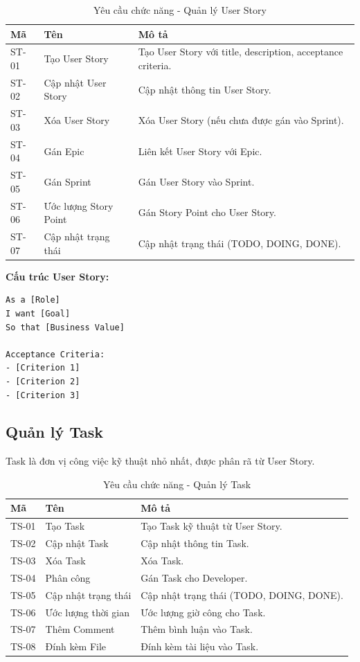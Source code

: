 \documentclass[12pt,a4paper]{report}
\begin{document}
\begin{table}[H]
\centering
\caption{Yêu cầu chức năng - Quản lý User Story}
\begin{tabular}{|p{2.5cm}|p{3.5cm}|p{8cm}|}
\hline
\textbf{Mã} & \textbf{Tên} & \textbf{Mô tả} \\
\hline
ST-01 & Tạo User Story & Tạo User Story với title, description, acceptance criteria. \\
\hline
ST-02 & Cập nhật User Story & Cập nhật thông tin User Story. \\
\hline
ST-03 & Xóa User Story & Xóa User Story (nếu chưa được gán vào Sprint). \\
\hline
ST-04 & Gán Epic & Liên kết User Story với Epic. \\
\hline
ST-05 & Gán Sprint & Gán User Story vào Sprint. \\
\hline
ST-06 & Ước lượng Story Point & Gán Story Point cho User Story. \\
\hline
ST-07 & Cập nhật trạng thái & Cập nhật trạng thái (TODO, DOING, DONE). \\
\hline
\end{tabular}
\label{tab:story_management_requirements}
\end{table}

\textbf{Cấu trúc User Story:}

\begin{verbatim}
As a [Role]
I want [Goal]
So that [Business Value]

Acceptance Criteria:
- [Criterion 1]
- [Criterion 2]
- [Criterion 3]
\end{verbatim}

\subsection{Quản lý Task}

Task là đơn vị công việc kỹ thuật nhỏ nhất, được phân rã từ User Story.

\begin{table}[H]
\centering
\caption{Yêu cầu chức năng - Quản lý Task}
\begin{tabular}{|p{2.5cm}|p{3.5cm}|p{8cm}|}
\hline
\textbf{Mã} & \textbf{Tên} & \textbf{Mô tả} \\
\hline
TS-01 & Tạo Task & Tạo Task kỹ thuật từ User Story. \\
\hline
TS-02 & Cập nhật Task & Cập nhật thông tin Task. \\
\hline
TS-03 & Xóa Task & Xóa Task. \\
\hline
TS-04 & Phân công & Gán Task cho Developer. \\
\hline
TS-05 & Cập nhật trạng thái & Cập nhật trạng thái (TODO, DOING, DONE). \\
\hline
TS-06 & Ước lượng thời gian & Ước lượng giờ công cho Task. \\
\hline
TS-07 & Thêm Comment & Thêm bình luận vào Task. \\
\hline
TS-08 & Đính kèm File & Đính kèm tài liệu vào Task. \\
\hline
\end{tabular}
\label{tab:task_management_requirements}
\end{table}
\end{document}
